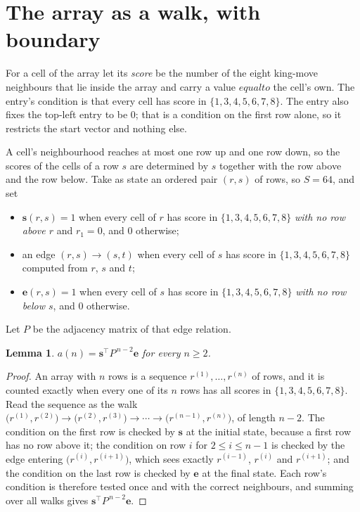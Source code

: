 \documentclass[11pt,a4paper]{article}
\theoremstyle{plain}
\newtheorem{lemma}[theorem]{Lemma}
\theoremstyle{definition}
\begin{document}
\section{The array as a walk, with boundary}

For a cell of the array let its \emph{score} be the number of the eight king-move neighbours that lie inside
the array and carry a value $equal to$ the cell's own. The entry's condition is that every cell
has score in $\{1,3,4,5,6,7,8\}$. The entry also fixes the top-left entry to be $0$; that is a condition on the first row alone, so it restricts the start vector and nothing else.

A cell's neighbourhood reaches at most one row up and one row down, so the scores of the
cells of a row $s$ are determined by $s$ together with the row above and the row below.
Take as state an ordered pair $(r,s)$ of rows, so $S=64$, and set
\begin{itemize}
\item $\mathbf{s}(r,s)=1$ when every cell of $r$ has score in $\{1,3,4,5,6,7,8\}$ \emph{with no row
above $r$} and $r_1=0$, and $0$ otherwise;
\item an edge $(r,s)\to(s,t)$ when every cell of $s$ has score in $\{1,3,4,5,6,7,8\}$ computed from
$r$, $s$ and $t$;
\item $\mathbf{e}(r,s)=1$ when every cell of $s$ has score in $\{1,3,4,5,6,7,8\}$ \emph{with no row
below $s$}, and $0$ otherwise.
\end{itemize}
Let $P$ be the adjacency matrix of that edge relation.

\begin{lemma}\label{lem:walk}
$a(n)=\mathbf{s}^{\!\top}P^{\,n-2}\mathbf{e}$ for every $n\ge2$.
\end{lemma}

\begin{proof}
An array with $n$ rows is a sequence $r^{(1)},\dots,r^{(n)}$ of rows, and it is counted
exactly when every one of its $n$ rows has all scores in $\{1,3,4,5,6,7,8\}$. Read the sequence as the
walk $\bigl(r^{(1)},r^{(2)}\bigr)\to\bigl(r^{(2)},r^{(3)}\bigr)\to\cdots\to
\bigl(r^{(n-1)},r^{(n)}\bigr)$, of length $n-2$. The condition on the first row is
checked by $\mathbf{s}$ at the initial state, because a first row has no row above it; the
condition on row $i$ for $2\le i\le n-1$ is checked by the edge entering
$\bigl(r^{(i)},r^{(i+1)}\bigr)$, which sees exactly $r^{(i-1)}$, $r^{(i)}$ and
$r^{(i+1)}$; and the condition on the last row is checked by $\mathbf{e}$ at the final
state. Each row's condition is therefore tested once and with the correct neighbours, and
summing over all walks gives $\mathbf{s}^{\!\top}P^{\,n-2}\mathbf{e}$.
\end{proof}
\end{document}
